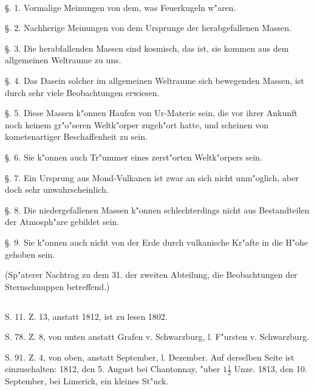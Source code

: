 \documentclass[a4paper, 11pt, oneside, polutonikogreek, german]{article}
\begin{document}
\paragraph{}
§. 1. Vormalige Meinungen von dem, was Feuerkugeln w"aren.

§. 2. Nachherige Meinungen von dem Ursprunge der herabgefallenen Massen.

§. 3. Die herabfallenden Massen sind kosmisch, das ist, sie kommen aus dem allgemeinen Weltraume zu uns.

§. 4. Das Dasein solcher im allgemeinen Weltraume sich bewegenden Massen, ist durch sehr viele Beobachtungen erwiesen.

§. 5. Diese Massen k"onnen Haufen von Ur-Materie sein, die vor ihrer Ankunft noch keinem gr"o"seren Weltk"orper zugeh"ort hatte, und scheinen von kometenartiger Beschaffenheit zu sein.

§. 6. Sie k"onnen auch Tr"ummer eines zerst"orten Weltk"orpers sein.

§. 7. Ein Ursprung aus Mond-Vulkanen ist zwar an sich nicht unm"oglich, aber doch sehr unwahrscheinlich.

§. 8. Die niedergefallenen Massen k"onnen schlechterdings nicht aus Bestandteilen der Atmosph"are gebildet sein.

§. 9. Sie k"onnen auch nicht von der Erde durch vulkanische Kr"afte in die H"ohe gehoben sein.

(Sp"aterer Nachtrag zu dem 31. der zweiten Abteilung, die Beobachtungen der Sternschnuppen betreffend.)

\subsection*{}
\clearpage
\subsection*{}
\paragraph{}
S. 11. Z. 13, anstatt 1812, ist zu lesen 1802.

S. 78. Z. 8, von unten anstatt Grafen v. Schwarzburg, l. F"ursten v. Schwarzburg.

S. 91. Z. 4, von oben, anstatt September, l. Dezember. Auf derselben Seite ist einzuschalten: 1812, den 5. August bei Chantonnay, "uber $\mathfrak{1\frac{1}{2}}$ Unze. 1813, den 10. September, bei Limerick, ein kleines St"uck.
\end{document}
